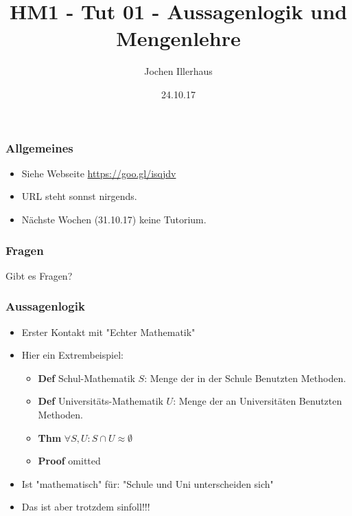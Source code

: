 \documentclass{beamer}
\title{HM1 - Tut 01 - Aussagenlogik und Mengenlehre}
\author{Jochen Illerhaus}
\institute{KIT}
\date{24.10.17}
\begin{document}
 
\frame{\titlepage}
 
\begin{frame}
    \frametitle{Allgemeines}
    \begin{itemize}
        \item Siehe Webseite \url{https://goo.gl/isqjdv}
        \item URL steht sonnst nirgends.
        \item Nächste Wochen (31.10.17) keine Tutorium.
    \end{itemize}
\end{frame}

\begin{frame}
    \frametitle{Fragen}
    
    \huge Gibt es Fragen?
    
\end{frame}

\begin{frame}
    \frametitle{Aussagenlogik}
     \begin{itemize}
        \item Erster Kontakt mit "Echter Mathematik"
        \item Hier ein Extrembeispiel:
            \begin{itemize}
                \item \textbf{Def} Schul-Mathematik $S$: Menge der in der Schule Benutzten Methoden.
                \item \textbf{Def} Universitäts-Mathematik $U$: Menge der an Universitäten Benutzten Methoden.
                \item \textbf{Thm} $\forall S, U: S \cap U \approx \emptyset$
                \item \textbf{Proof} omitted
            \end{itemize}
        \item Ist "mathematisch" für: "Schule und Uni unterscheiden sich"
        \item Das ist aber trotzdem sinfoll!!!
    \end{itemize}
\end{frame}
\end{document}
